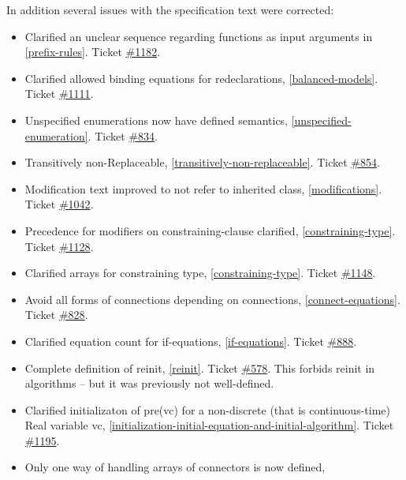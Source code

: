 In addition several issues with the specification text were corrected:

\begin{itemize}
\item
  Clarified an unclear sequence regarding functions as input arguments
  in \autoref{prefix-rules}. Ticket
  \href{https://trac.modelica.org/Modelica/ticket/1182}{\#1182}.
\item
  Clarified allowed binding equations for redeclarations, \autoref{balanced-models}.
  Ticket \href{https://trac.modelica.org/Modelica/ticket/1111}{\#1111}.
\item
  Unspecified enumerations now have defined semantics, \autoref{unspecified-enumeration}.
  Ticket \href{https://trac.modelica.org/Modelica/ticket/834}{\#834}.
\item
  Transitively non-Replaceable, \autoref{transitively-non-replaceable}. Ticket
  \href{https://trac.modelica.org/Modelica/ticket/854}{\#854}.
\item
  Modification text improved to not refer to inherited class, 
  \autoref{modifications}. Ticket
  \href{https://trac.modelica.org/Modelica/ticket/1042}{\#1042}.
\item
  Precedence for modifiers on constraining-clause clarified, \autoref{constraining-type}. Ticket
  \href{https://trac.modelica.org/Modelica/ticket/1128}{\#1128}.
\item
  Clarified arrays for constraining type, \autoref{constraining-type}. Ticket
  \href{https://trac.modelica.org/Modelica/ticket/1148}{\#1148}.
\item
  Avoid all forms of connections depending on connections, 
  \autoref{connect-equations}. Ticket
  \href{https://trac.modelica.org/Modelica/ticket/828}{\#828}.
\item
  Clarified equation count for if-equations, \autoref{if-equations}. Ticket
  \href{https://trac.modelica.org/Modelica/ticket/888}{\#888}.
\item
  Complete definition of reinit, \autoref{reinit}. Ticket
  \href{https://trac.modelica.org/Modelica/ticket/578}{\#578}. This
  forbids reinit in algorithms -- but it was previously not
  well-defined.
\item
  Clarified initializaton of pre(vc) for a non-discrete (that is
  continuous-time) Real variable vc, \autoref{initialization-initial-equation-and-initial-algorithm}. Ticket
  \href{https://trac.modelica.org/Modelica/ticket/1195}{\#1195}.
\item
  Only one way of handling arrays of connectors is now defined, 

\end{itemize}
